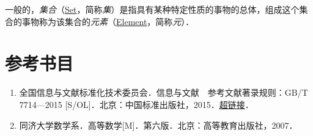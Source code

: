 一般的，\emph{集合}（\href{http://mathworld.wolfram.com/Set.html}{Set}，简称\emph{集}）是指具有某种特定性质的事物的总体，组成这个集合的事物称为该集合的\emph{元素}（\href{http://mathworld.wolfram.com/Element.html}{Element}，简称\emph{元}）．



\appendix

\chapter{参考书目}

\begin{enumerate}
	\item 全国信息与文献标准化技术委员会．信息与文献　参考文献著录规则：GB/T 7714—2015 [S/OL]．北京：中国标准出版社，2015．\href{http://www.scal.edu.cn/dxtsgxb/201906120155}{超链接}．
	\item 同济大学数学系．高等数学[M]．第六版．北京：高等教育出版社，2007．
\end{enumerate}


